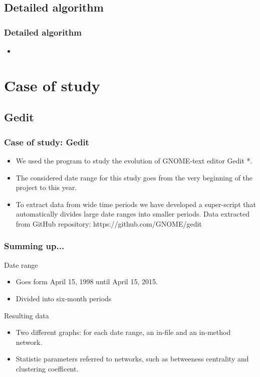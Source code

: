\documentclass{beamer}
\begin{document}
\subsection{Detailed algorithm} 

\begin{frame}
\frametitle{Detailed algorithm}
\begin{itemize}
\item <Several slides including graphic representations>

\end{itemize}
\end{frame}

\section{Case of study}
\subsection{Gedit}
\begin{frame}
\frametitle{Case of study: Gedit}
\begin{itemize}
\item We used the program to study the evolution of GNOME-text editor Gedit *.
\item The considered date range for this study goes from the very beginning of the project to this year.
\item To extract data from wide time periods we have developed a super-script that automatically divides large date ranges into smaller periods.
\text * Data extracted from GitHub repository: https://github.com/GNOME/gedit
\end{itemize}
\end{frame}


\begin{frame}
\frametitle{Summing up...}
\begin{block}{Date range}
\begin{itemize}
\item Goes form April 15, 1998 until April 15, 2015.
\item Divided into six-month periods
\end{itemize}
\end{block}

\begin{block}{Resulting data}
\begin{itemize}
\item Two different graphs: for each date range, 
an in-file and an in-method network.
\item Statistic parameters referred to networks, such as betweeness centrality and clustering coefficent.
\end{itemize}
\end{block}

\end{frame}
\end{document}
